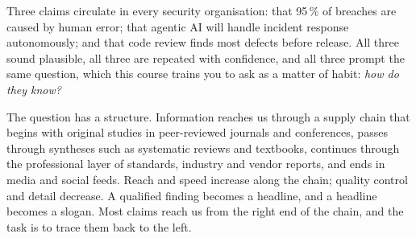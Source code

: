 \documentclass[11pt,a4paper,british,twoside=false,headings=small,chapterprefix=false,numbers=noenddot]{scrbook}
\begin{document}
Three claims circulate in every security organisation: that 95\,\% of breaches are caused by human error; that agentic AI will handle incident response autonomously; and that code review finds most defects before release. All three sound plausible, all three are repeated with confidence, and all three prompt the same question, which this course trains you to ask as a matter of habit: \emph{how do they know?}

The question has a structure. Information reaches us through a supply chain that begins with original studies in peer-reviewed journals and conferences, passes through syntheses such as systematic reviews and textbooks, continues through the professional layer of standards, industry and vendor reports, and ends in media and social feeds. Reach and speed increase along the chain; quality control and detail decrease. A qualified finding becomes a headline, and a headline becomes a slogan. Most claims reach us from the right end of the chain, and the task is to trace them back to the left.

\begin{center}\small
\begin{center}
  \end{center}
\end{center}
\end{document}
